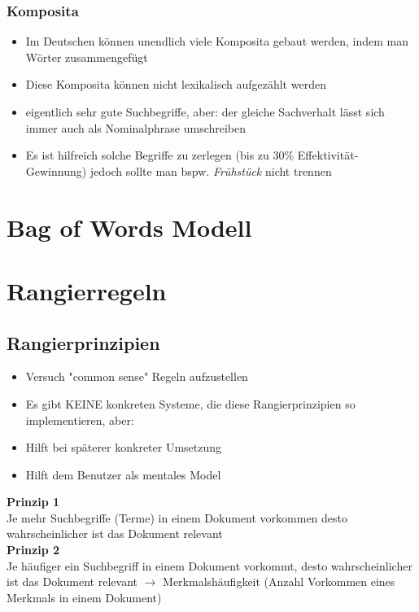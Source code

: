 \documentclass{report}
\theoremstyle{definition}
\theoremstyle{example}
\begin{document}
\subsubsection{Komposita}
\begin{itemize}
   \item Im Deutschen können unendlich viele Komposita gebaut werden, indem man Wörter zusammengefügt
   \item Diese Komposita können nicht lexikalisch aufgezählt werden
   \item eigentlich sehr gute Suchbegriffe, aber: der gleiche Sachverhalt lässt sich immer auch als Nominalphrase umschreiben
   \item Es ist hilfreich solche Begriffe zu zerlegen (bis zu 30\% Effektivität-Gewinnung)
   \subitem jedoch sollte man bspw. \textit{Frühstück} nicht trennen 
\end{itemize}

\section{Bag of Words Modell}


\section{Rangierregeln}

\subsection{Rangierprinzipien}
\begin{itemize}
   \item Versuch "common sense" Regeln aufzustellen
   \item Es gibt KEINE konkreten Systeme, die diese Rangierprinzipien so implementieren, aber:
   \item Hilft bei späterer konkreter Umsetzung
   \item Hilft dem Benutzer als mentales Model
\end{itemize}

\textbf{Prinzip 1}\\
Je mehr Suchbegriffe (Terme) in einem Dokument vorkommen desto wahrscheinlicher ist das Dokument relevant\\

\textbf{Prinzip 2}\\
Je häufiger ein Suchbegriff in einem Dokument vorkommt, desto wahrscheinlicher ist das Dokument relevant $\rightarrow$ Merkmalshäufigkeit (Anzahl Vorkommen eines Merkmals in einem Dokument)\\
\end{document}

